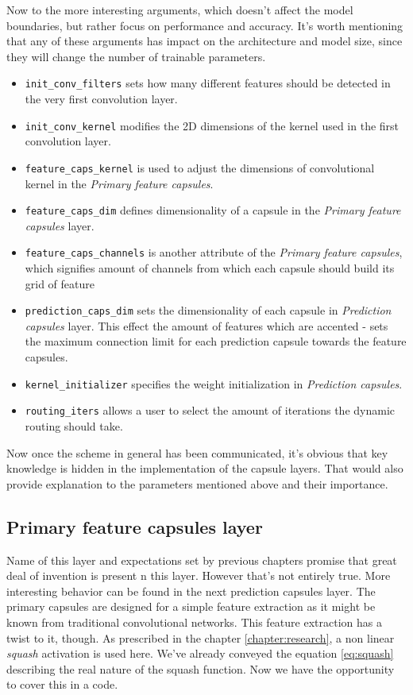 Now to the more interesting arguments, which doesn't affect the model boundaries, but rather focus on performance and accuracy. It's worth mentioning that any of these arguments has impact on the architecture and model size, since they will change the number of trainable parameters.

\begin{itemize}
    \item \texttt{init\_conv\_filters} sets how many different features should be detected in the very first convolution layer.
    \item \texttt{init\_conv\_kernel} modifies the 2D dimensions of the kernel used in the first convolution layer.
    \item \texttt{feature\_caps\_kernel} is used to adjust the dimensions of convolutional kernel in the \textit{Primary feature capsules}.
    \item \texttt{feature\_caps\_dim} defines dimensionality of a capsule in the \textit{Primary feature capsules} layer.
    \item \texttt{feature\_caps\_channels} is another attribute of the \textit{Primary feature capsules}, which signifies amount of channels from which each capsule should build its grid of feature
    \item \texttt{prediction\_caps\_dim} sets the dimensionality of each capsule in \textit{Prediction capsules} layer. This effect the amount of features which are accented - sets the maximum connection limit for each prediction capsule towards the feature capsules.
    \item \texttt{kernel\_initializer} specifies the weight initialization in \textit{Prediction capsules}.
    \item \texttt{routing\_iters} allows a user to select the amount of iterations the dynamic routing should take.
\end{itemize}

Now once the scheme in general has been communicated, it's obvious that key knowledge is hidden in the implementation of the capsule layers. That would also provide explanation to the parameters mentioned above and their importance.

\subsection{Primary feature capsules layer}

Name of this layer and expectations set by previous chapters promise that great deal of invention is present n this layer. However that's not entirely true. More interesting behavior can be found in the next prediction capsules layer. The primary capsules are designed for a simple feature extraction as it might be known from traditional convolutional networks. This feature extraction has a twist to it, though. As prescribed in the chapter \ref{chapter:research}, a non linear \textit{squash} activation is used here. We've already conveyed the equation \ref{eq:squash} describing the real nature of the squash function. Now we have the opportunity to cover this in a code.

